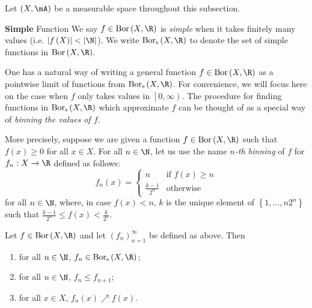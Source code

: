 \documentclass[pmath450]{subfiles}
\begin{document}
    Let $\left( X,\mA \right)$ be a measurable space throughout this subsection.

    \begin{definition}{\textbf{Simple} Function}
        We say $f\in\bor\left( X,\R \right)$ is \emph{simple} when it takes finitely many values (i.e. $\left| f\left( X \right) \right|<\left| \N \right|$). We write $\bors\left( X,\R \right)$ to denote the set of simple functions in $\bor\left( X,\R \right)$.
    \end{definition}

    \np One has a natural way of writing a general function $f\in\bor\left( X,\R \right)$ as a pointwise limit of functions from $\bors\left( X,\R \right)$. For convenience, we will focus here on the case when $f$ only takes values in $\left[ 0,\infty \right)$. The procedure for finding functions in $\bors\left( X,\R \right)$ which approximate $f$ can be thought of as a special way of \textit{binning the values of $f$}.
    
    More precisely, suppose we are given a function $f\in\bor\left( X,\R \right)$ such that $f\left( x \right)\geq 0$ for all $x\in X$. For all $n\in\N$, let us use the name \textit{$n$-th binning} of $f$ for $f_n:X\to\R$ defined as follows:
    \begin{equation*}
        f_n\left( x \right) =
        \begin{cases} 
            n & \text{if $f\left( x \right)\geq n$} \\
            \frac{k-1}{2^n} & \text{otherwise}
        \end{cases}
    \end{equation*}
    for all $n\in\N$, where, in case $f\left( x \right)<n$, $k$ is the unique element of $\left\lbrace 1,\ldots,n 2^n \right\rbrace$ such that $\frac{k-1}{2^n}\leq f\left( x \right)<\frac{k}{2^n}$.

    \begin{prop}{}
        Let $f\in\bor\left( X,\R \right)$ and let $\left( f_{n} \right)^{\infty}_{n=1}$ be defined as above. Then
        \begin{enumerate}
            \item for all $n\in\N$, $f_n\in\bors\left( X,\R \right)$; 
            \item for all $n\in\N$, $f_n\leq f_{n+1}$;\footnotemark[1]
            \item for all $x\in X$, $f_n\left( x \right)\nearrow f\left( x \right)$.\footnotemark[2]
        \end{enumerate}
        
        \noindent
        \begin{minipage}{\textwidth}
        \end{minipage}
    \end{prop}
\end{document}
